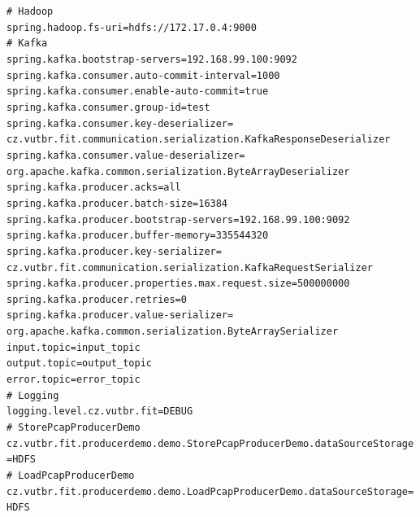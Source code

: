 \vspace{0.5cm}
\noindent \texttt{\#   Hadoop \\
spring.hadoop.fs-uri=hdfs://172.17.0.4:9000 \\
\#   Kafka \\
spring.kafka.bootstrap-servers=192.168.99.100:9092 \\
spring.kafka.consumer.auto-commit-interval=1000 \\
spring.kafka.consumer.enable-auto-commit=true \\
spring.kafka.consumer.group-id=test \\
spring.kafka.consumer.key-deserializer= \\
\indent cz.vutbr.fit.communication.serialization.KafkaResponseDeserializer \\
spring.kafka.consumer.value-deserializer= \\
\indent org.apache.kafka.common.serialization.ByteArrayDeserializer \\
spring.kafka.producer.acks=all \\
spring.kafka.producer.batch-size=16384 \\
spring.kafka.producer.bootstrap-servers=192.168.99.100:9092 \\
spring.kafka.producer.buffer-memory=335544320 \\
spring.kafka.producer.key-serializer= \\
\indent cz.vutbr.fit.communication.serialization.KafkaRequestSerializer \\
spring.kafka.producer.properties.max.request.size=500000000 \\
spring.kafka.producer.retries=0 \\
spring.kafka.producer.value-serializer= \\
\indent org.apache.kafka.common.serialization.ByteArraySerializer \\
input.topic=input\_topic \\
output.topic=output\_topic \\
error.topic=error\_topic \\
\#   Logging \\
logging.level.cz.vutbr.fit=DEBUG \\
\#   StorePcapProducerDemo \\
cz.vutbr.fit.producerdemo.demo.StorePcapProducerDemo.dataSourceStorage=HDFS \\
\#   LoadPcapProducerDemo \\
cz.vutbr.fit.producerdemo.demo.LoadPcapProducerDemo.dataSourceStorage=HDFS
}

